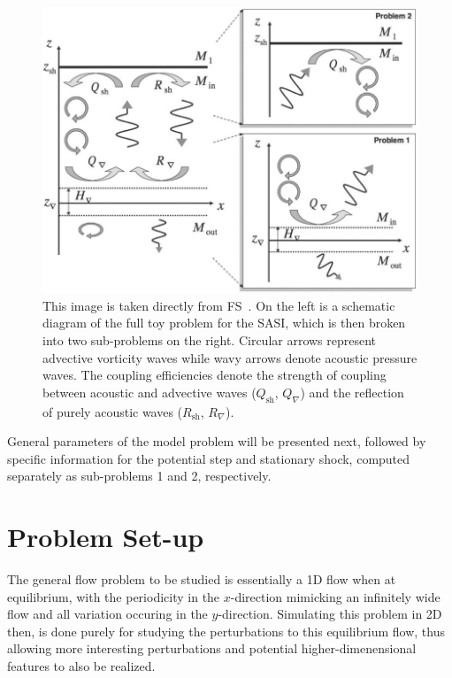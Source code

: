 \begin {figure}
\centering
\includegraphics[width=13cm]{figures/Sato1}
\caption {This image is taken directly from FS~\cite{Sato2009}. On the left is a schematic diagram of the full toy problem for the SASI,  which is then broken into two sub-problems on the right. Circular arrows represent advective vorticity waves while wavy arrows denote acoustic pressure waves. The coupling efficiencies denote the strength of coupling between acoustic and advective waves ($Q_\textrm{sh}$, $Q_\nabla$) and the reflection of purely acoustic waves ($R_\textrm{sh}$, $R_\nabla$).}
\label{fig:Sato1}
\end{figure}

General parameters of the model problem will be presented next, followed by specific information for the potential step and stationary shock, computed separately as sub-problems 1 and 2, respectively. 


\section{Problem Set-up}
\label{sec:TP_set_up}

The general flow problem to be studied is essentially a 1D flow when at equilibrium, with the periodicity in the $x$-direction mimicking an infinitely wide flow and all variation occuring in the $y$-direction. Simulating this problem in 2D then, is done purely for studying the perturbations to this equilibrium flow, thus allowing more interesting perturbations and potential higher-dimenensional features to also be realized.

